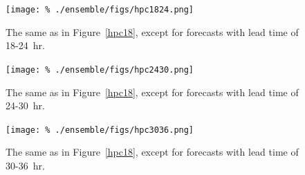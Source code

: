 \clearpage
\begin{figure}[cc]
    \centering
    \texttt{[image: \%
    ./ensemble/figs/hpc1824.png]}\\
    \caption{The same as in \mbox{Figure \ref{hpc18}}, except for forecasts with lead time of \mbox{18-24 hr}.}
    \label{hpc24}
\end{figure}


\clearpage
\begin{figure}[cc]
    \centering
    \texttt{[image: \%
    ./ensemble/figs/hpc2430.png]}\\
    \caption{The same as in \mbox{Figure \ref{hpc18}}, except for forecasts with lead time of \mbox{24-30 hr}.}
    \label{hpc30}
\end{figure}


\clearpage
\begin{figure}[cc]
    \centering
    \texttt{[image: \%
    ./ensemble/figs/hpc3036.png]}\\
    \caption{The same as in \mbox{Figure \ref{hpc18}}, except for forecasts with lead time of \mbox{30-36 hr}.}
    \label{hpc36}
\end{figure}
